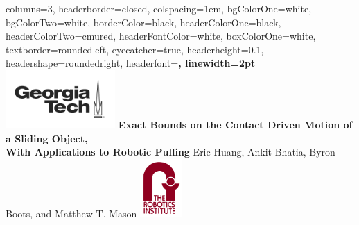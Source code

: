 \documentclass[landscape,paperwidth=42in,paperheight=32in,margin=1.5in,fontscale = 0.32]{baposter} %
\begin{document}
\begin{poster}
{
  columns=3,
  headerborder=closed, %
  colspacing=1em, %
  bgColorOne=white, %
  bgColorTwo=white, %
  borderColor=black, %
  headerColorOne=black, %
  headerColorTwo=cmured,%
  headerFontColor=white, %
  boxColorOne=white, %
  textborder=roundedleft, %
  eyecatcher=true, %
  headerheight=0.1\textheight, %
  headershape=roundedright, %
  headerfont=\large\bf\textsc, %
  linewidth=2pt %
}
%
{\includegraphics[height=6em]{images/gt_logo.png}} %
{\textbf{Exact Bounds on the Contact Driven Motion of a Sliding
    Object,\\\vspace{1mm} With Applications to Robotic Pulling}
  \vspace{3mm}} %
{\LARGE{{Eric Huang, Ankit Bhatia, Byron Boots, and Matthew
      T. Mason}}\vspace{3mm}} %
{\includegraphics[height=6em]{images/ri_logo.png}} %

\end{poster}
\end{document}
